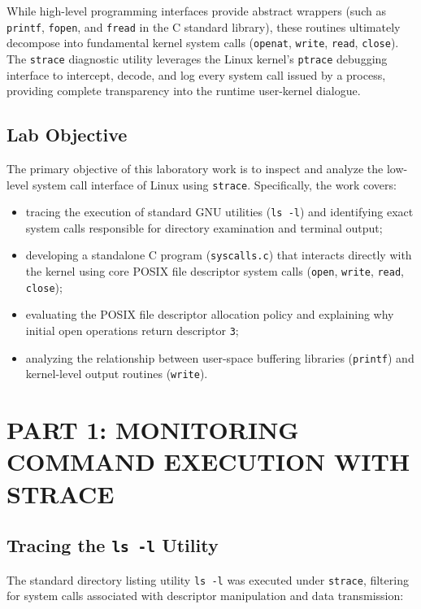 \documentclass[12pt,a4paper]{report}
\numberwithin{equation}{chapter}
\numberwithin{figure}{chapter}
\numberwithin{table}{chapter}
\begin{document}
While high-level programming interfaces provide abstract wrappers (such as \texttt{printf}, \texttt{fopen}, and \texttt{fread} in the C standard library), these routines ultimately decompose into fundamental kernel system calls (\texttt{openat}, \texttt{write}, \texttt{read}, \texttt{close}). The \texttt{strace} diagnostic utility leverages the Linux kernel's \texttt{ptrace} debugging interface to intercept, decode, and log every system call issued by a process, providing complete transparency into the runtime user-kernel dialogue.

\section{Lab Objective}
The primary objective of this laboratory work is to inspect and analyze the low-level system call interface of Linux using \texttt{strace}. Specifically, the work covers:
\begin{itemize}
    \item tracing the execution of standard GNU utilities (\texttt{ls -l}) and identifying exact system calls responsible for directory examination and terminal output;
    \item developing a standalone C program (\texttt{syscalls.c}) that interacts directly with the kernel using core POSIX file descriptor system calls (\texttt{open}, \texttt{write}, \texttt{read}, \texttt{close});
    \item evaluating the POSIX file descriptor allocation policy and explaining why initial open operations return descriptor \texttt{3};
    \item analyzing the relationship between user-space buffering libraries (\texttt{printf}) and kernel-level output routines (\texttt{write}).
\end{itemize}

\chapter{PART 1: MONITORING COMMAND EXECUTION WITH STRACE}

\section{Tracing the \texttt{ls -l} Utility}
The standard directory listing utility \texttt{ls -l} was executed under \texttt{strace}, filtering for system calls associated with descriptor manipulation and data transmission:
\end{document}
